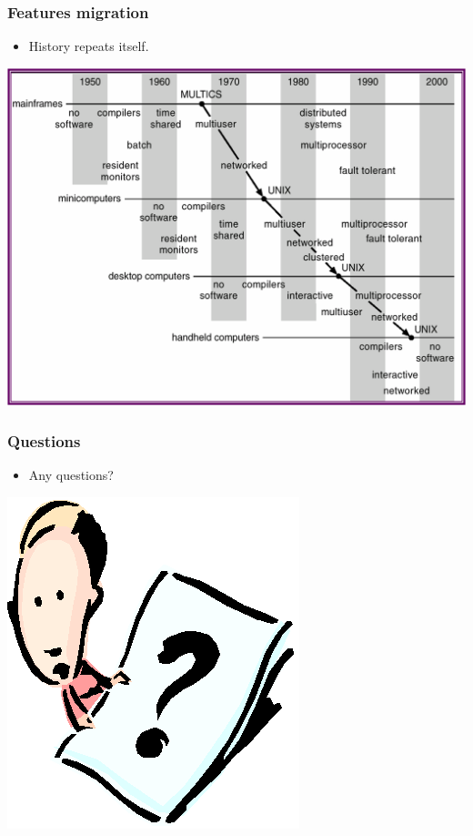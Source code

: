 \documentclass[CJKutf8,xcolor=pdftex,dvipsnames,table]{beamer}
\begin{document}
\begin{CJK*}{UTF8}{song}
  \begin{frame}
    \frametitle{Features migration} \pause
	  \begin{itemize}
	  \item{History repeats itself.} \pause
	  \end{itemize}
	  \begin{center}
	    \includegraphics[scale=0.4]{v6f1-6}
	  \end{center}
  \end{frame}

  \begin{frame}
    \frametitle{Questions}
	  \begin{itemize}
	  \item{Any questions?}
	  \end{itemize}
	  \begin{center}
	    \includegraphics[scale=.5]{question}
	  \end{center}
  \end{frame}
  
\end{CJK*}
\end{document}
